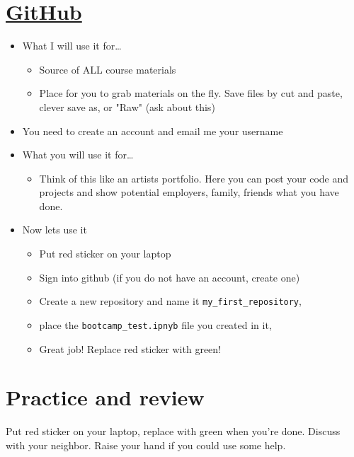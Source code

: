 \section*{\href{https://github.com}{GitHub}}
\begin{itemize}
\item What I will use it for\ldots
\begin{itemize}
\item Source of ALL course materials
\item Place for you to grab materials on the fly. Save files by cut and paste, clever save as, or "Raw" (ask about this)
\end{itemize}
\item You need to create an account and email me your username
\item What you will use it for\ldots
\begin{itemize}
\item Think of this like an artists portfolio. Here you can post your code and projects and show potential employers, family, friends what you have done.
\end{itemize}
\item Now lets use it
\begin{itemize}
\item Put red sticker on your laptop
\item Sign into github (if you do not have an account, create one)
\item Create a new repository and name it \verb|my_first_repository|,
\item place the \verb|bootcamp_test.ipnyb| file you created in it,
\item Great job! Replace red sticker with green!\\
\end{itemize}
\end{itemize}


\section*{Practice and review}


Put red sticker on your laptop, replace with green when you're done.
Discuss with your neighbor.
Raise your hand if you could use some help.

